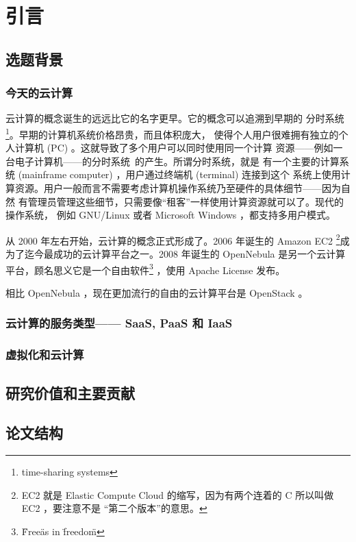 \chapter{引言}
\label{cha:intro}

\section{选题背景}

\subsection{今天的云计算}

云计算的概念诞生的远远比它的名字更早。它的概念可以追溯到早期的
分时系统\footnote{time-sharing systems}。早期的计算机系统价格昂贵，而且体积庞大，
使得个人用户很难拥有独立的个人计算机 (PC) 。这就导致了多个用户可以同时使用同一个计算
资源——例如一台电子计算机——的分时系统~\cite{time-sharing}的产生。所谓分时系统，就是
有一个主要的计算系统 (mainframe computer) ，用户通过终端机 (terminal) 连接到这个
系统上使用计算资源。用户一般而言不需要考虑计算机操作系统乃至硬件的具体细节——因为自然
有管理员管理这些细节，只需要像“租客”一样使用计算资源就可以了。现代的操作系统，
例如 GNU/Linux 或者 Microsoft Windows ，都支持多用户模式。

从 2000 年左右开始，云计算的概念正式形成了。2006 年诞生的 Amazon EC2 \footnote{EC2
  就是 Elastic Compute Cloud 的缩写，因为有两个连着的 C 所以叫做 EC2 ，要注意不是
  “第二个版本”的意思。}成为了迄今最成功的云计算平台之一。2008 年诞生的 OpenNebula
是另一个云计算平台，顾名思义它是一个自由软件\footnote{\"Free\" as in \"freedom\"}
，使用 Apache License 发布。

相比 OpenNebula ，现在更加流行的自由的云计算平台是 OpenStack 。

\subsection{云计算的服务类型—— SaaS, PaaS 和 IaaS}

\subsection{虚拟化和云计算}

\section{研究价值和主要贡献}

\section{论文结构}
